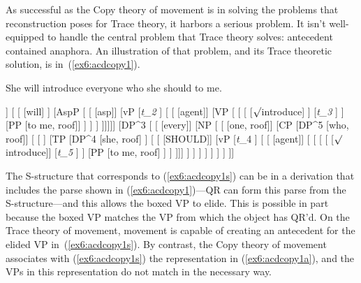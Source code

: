 As successful as the Copy theory of movement is in solving the problems that reconstruction poses for Trace theory, it harbors a serious problem. It isn't well-equipped to handle the central problem that Trace theory solves: antecedent contained anaphora. An illustration of that problem, and its Trace theoretic solution, is in~(\ref{ex6:acdcopy1}).
\medskip
\begin{fullwidth}
\begin{exe} 
	\raggedright
			\ex \label{ex6:acdcopy1s} She will introduce everyone who she should to me.
			\ex \label{ex6:acdcopy1}
			\footnotesize
			\begin{forest}
				[TP
				[TP
					[DP^2 [she, roof]]
					[ 
						[ [will] ]
						[AspP
						[
						[ [asp]]
						[vP
							[\emph{t_2} ]
							[
								[ [agent]]
								[VP [
									[
									[ [$\surd$introduce] ]
									[\emph{t_3} ]
									]
									[PP [to me, roof]]
								] ]
							 ]
						 ]]]]]
				[DP^3 [
					[ [every]]
					[NP [
						[ [one, roof]]
						[CP 
						[DP^5 [who, roof]]
						[
							[ ]
							[TP 
								[DP^4 [she, roof] ]
								[
									[ [SHOULD]]
									[vP
										[\emph{t}_4 ]
										[
										[ [agent]]
										[ [
											[ 
												[ [$\surd$introduce]]
												[\emph{t_5} ]
											]
											[PP [to me, roof] ]
										] ]]]
									 ]
								 ]
							 ]
						] ]
					] ]
			]]
			\end{forest}%
	\end{exe}
\end{fullwidth}
\medskip
The S-structure that corresponds to (\ref{ex6:acdcopy1s}) can be in a derivation that includes the parse shown in (\ref{ex6:acdcopy1})---QR can form this parse from the S-structure---and this allows the boxed VP to elide. This is possible in part because the boxed VP matches the VP from which the object has QR'd. %
%
%
%
On the Trace theory of movement, movement is capable of creating an antecedent for the elided VP in~(\ref{ex6:acdcopy1s}). By contrast, the Copy theory of movement associates with (\ref{ex6:acdcopy1s}) the representation in (\ref{ex6:acdcopy1a}), and the VPs in this representation do not match in the necessary way.
